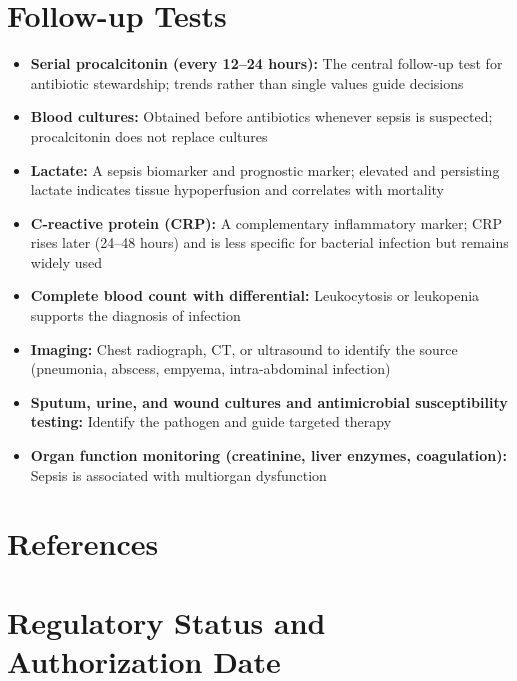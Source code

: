 \section*{Follow-up Tests}
\begin{itemize}
  \item \textbf{Serial procalcitonin (every 12--24 hours):} The central follow-up test for antibiotic stewardship; trends rather than single values guide decisions
  \item \textbf{Blood cultures:} Obtained before antibiotics whenever sepsis is suspected; procalcitonin does not replace cultures
  \item \textbf{Lactate:} A sepsis biomarker and prognostic marker; elevated and persisting lactate indicates tissue hypoperfusion and correlates with mortality
  \item \textbf{C-reactive protein (CRP):} A complementary inflammatory marker; CRP rises later (24--48 hours) and is less specific for bacterial infection but remains widely used
  \item \textbf{Complete blood count with differential:} Leukocytosis or leukopenia supports the diagnosis of infection
  \item \textbf{Imaging:} Chest radiograph, CT, or ultrasound to identify the source (pneumonia, abscess, empyema, intra-abdominal infection)
  \item \textbf{Sputum, urine, and wound cultures and antimicrobial susceptibility testing:} Identify the pathogen and guide targeted therapy
  \item \textbf{Organ function monitoring (creatinine, liver enzymes, coagulation):} Sepsis is associated with multiorgan dysfunction
\end{itemize}

\section*{References}



\clearpage
\section*{Regulatory Status and Authorization Date}

\clearpage
